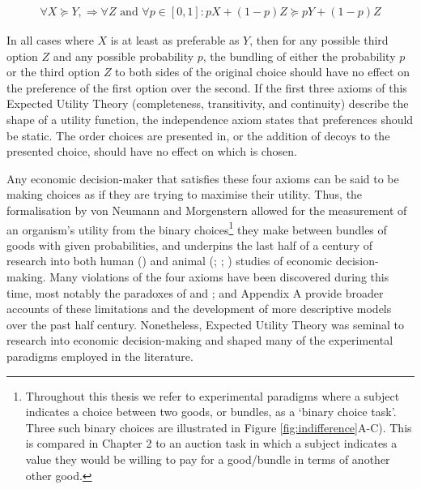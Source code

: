 \begin{equation}
\begin{aligned}
\forall X \succeq Y, \Rightarrow \forall Z \text{ and } \forall p \in [0,1]: pX + (1-p)Z \succeq pY + (1-p)Z
\label{eq:axiom_independence}
\end{aligned}
\end{equation}

In all cases where $X$ is at least as preferable as $Y$, then for any possible third option $Z$ and any possible probability $p$, the bundling of either the probability $p$ or the third option $Z$ to both sides of the original choice should have no effect on the preference of the first option over the second. If the first three axioms of this Expected Utility Theory (completeness, transitivity, and continuity) describe the shape of a utility function, the independence axiom states that preferences should be static. The order choices are presented in, or the addition of decoys to the presented choice, should have no effect on which is chosen.

Any economic decision-maker that satisfies these four axioms can be said to be making choices as if they are trying to maximise their utility. Thus, the formalisation by von Neumann and Morgenstern allowed for the measurement of an organism's utility from the binary choices\footnote{Throughout this thesis we refer to experimental paradigms where a subject indicates a choice between two goods, or bundles, as a ‘binary choice task’. Three such binary choices are illustrated in Figure \ref{fig:indifference}A-C). This is compared in Chapter 2 to an auction task in which a subject indicates a value they would be willing to pay for a good/bundle in terms of another other good.} they make between bundles of goods with given probabilities, and underpins the last half of a century of research into both human (\cite{mostellerExperimentalMeasurementUtility1951}) and animal (\cite{ferraritonioloReliablePopulationCode2023}; \cite{genestUtilityFunctionsPredict2016}; \cite{pastorMonkeysChooseIf2017}) studies of economic decision-making. Many violations of the four axioms have been discovered during this time, most notably the paradoxes of \cite{allaisComportementLHommeRationnel1953} and \cite{ellsbergRiskAmbiguitySavage1961}; \cite{machinaChoiceUncertaintyProblems1987} and Appendix A provide broader accounts of these limitations and the development of more descriptive models over the past half century. Nonetheless, Expected Utility Theory was seminal to research into economic decision-making and shaped many of the experimental paradigms employed in the literature.

